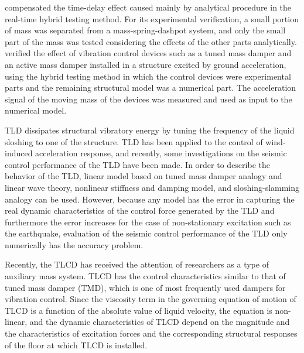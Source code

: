 \citet{horiuchi1999development} compensated the time-delay effect caused mainly by analytical procedure in the real-time hybrid testing method\citep{horiuchi1999development}. For its experimental verification, a small portion of mass was separated from a mass-spring-dashpot system, and only the small part of the mass was tested considering the effects of the other parts analytically. \citet{iemura1999substructured,igarashi2000development} verified the effect of vibration control devices such as a tuned mass damper and an active mass damper installed in a structure excited by ground acceleration, using the hybrid testing method in which the control devices were experimental parts and the remaining structural model was a numerical part. The acceleration signal of the moving mass of the devices was measured and used as input to the numerical model\cite{iemura1999substructured,igarashi2000development}.

TLD dissipates structural vibratory energy by tuning the frequency of the liquid sloshing to one of the structure\citep{soong1997passive}. TLD has been applied to the control of wind-induced acceleration response\citep{chang1998unified}, and recently, some investigations on the seismic control performance of the TLD have been made\citep{banerji2000tuned}. In order to describe the behavior of the TLD, linear model based on tuned mass damper analogy\citep{sun1995properties} and linear wave theory, nonlinear stiffness and damping model\citep{yu1999non}, and sloshing-slamming analogy\citep{yalla2001liquid} can be used. However, because any model has the error in capturing the real dynamic characteristics of the control force generated by the TLD and furthermore the error increases for the case of non-stationary excitation such as the earthquake, evaluation of the seismic control performance of the TLD only numerically has the accuracy problem.

Recently, the TLCD has received the attention of researchers as a type of auxiliary mass system\citep{samali1998wind}. TLCD has the control characteristics similar to that of tuned mass damper (TMD), which is one of most frequently used dampers for vibration control. Since the viscosity term in the governing equation of motion of TLCD is a function of the absolute value of liquid velocity, the equation is non-linear, and the dynamic characteristics of TLCD depend on the magnitude and the characteristics of excitation forces and the corresponding structural responses of the floor at which TLCD is installed\citep{yalla2001liquid}.

